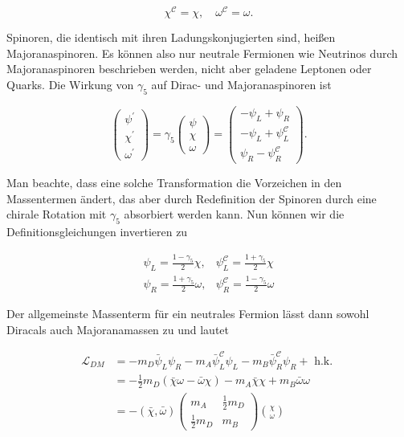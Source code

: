\documentclass[10pt, letterpaper]{article}
\begin{document}
$$
\chi^{\mathcal{C}}=\chi, \quad \omega^{\mathcal{C}}=\omega .
$$

Spinoren, die identisch mit ihren Ladungskonjugierten sind, heißen Majoranaspinoren. Es können also nur neutrale Fermionen wie Neutrinos durch Majoranaspinoren beschrieben werden, nicht aber geladene Leptonen oder Quarks. Die Wirkung von $\gamma_{5}$ auf Dirac- und Majoranaspinoren ist

$$
\left(\begin{array}{c}
\psi^{\prime} \\
\chi^{\prime} \\
\omega^{\prime}
\end{array}\right)=\gamma_{5}\left(\begin{array}{c}
\psi \\
\chi \\
\omega
\end{array}\right)=\left(\begin{array}{c}
-\psi_{L}+\psi_{R} \\
-\psi_{L}+\psi_{L}^{\mathcal{C}} \\
\psi_{R}-\psi_{R}^{\mathcal{C}}
\end{array}\right) .
$$

Man beachte, dass eine solche Transformation die Vorzeichen in den Massentermen ändert, das aber durch Redefinition der Spinoren durch eine chirale Rotation mit $\gamma_{5}$ absorbiert werden kann. Nun können wir die Definitionsgleichungen invertieren zu

$$
\begin{array}{ll}
\psi_{L}=\frac{1-\gamma_{5}}{2} \chi, & \psi_{L}^{\mathcal{C}}=\frac{1+\gamma_{5}}{2} \chi \\
\psi_{R}=\frac{1+\gamma_{5}}{2} \omega, & \psi_{R}^{\mathcal{C}}=\frac{1-\gamma_{5}}{2} \omega
\end{array}
$$

Der allgemeinste Massenterm für ein neutrales Fermion lässt dann sowohl Diracals auch Majoranamassen zu und lautet

$$
\begin{aligned}
\mathscr{L}_{D M} & =-m_{D} \bar{\psi}_{L} \psi_{R}-m_{A} \bar{\psi}_{L}^{\mathcal{C}} \psi_{L}-m_{B} \bar{\psi}_{R}^{\mathcal{C}} \psi_{R}+\text { h.k. } \\
& =-\frac{1}{2} m_{D}(\bar{\chi} \omega-\bar{\omega} \chi)-m_{A} \bar{\chi} \chi+m_{B} \bar{\omega} \omega \\
& =-(\bar{\chi}, \bar{\omega})\left(\begin{array}{cc}
m_{A} & \frac{1}{2} m_{D} \\
\frac{1}{2} m_{D} & m_{B}
\end{array}\right)\binom{\chi}{\omega}
\end{aligned}
$$
\end{document}
